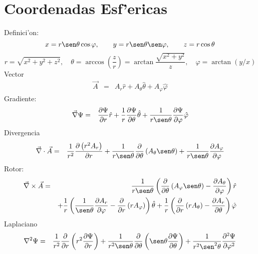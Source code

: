 \section{Coordenadas Esf'ericas}
Definici'on:
\begin{equation}
    x  =  r\sen\theta\cos\varphi, \qquad
    y  =  r\sen\theta\sen\varphi , \qquad
    z  =  r\cos\theta
\end{equation}
\begin{equation}
    r  =  \sqrt{x^2 + y^2 + z^2} , \quad
    \theta  =  \arccos(\frac{z}{r}) = \arctan{\frac{\sqrt{x^2+y^2}}{z}}, \quad
    \varphi  =  \arctan{(y/x)}
\end{equation}
Vector
\begin{eqnarray}
\vec{A}
&=& A_r {\hat r} + A_\theta {\hat \theta} +
A_\varphi {\hat \varphi}
\end{eqnarray}
Gradiente:
\begin{eqnarray}
 \vec\nabla\Psi
 &=& {\partial\Psi\over \partial r} {\hat r}
  + {1 \over r}{\partial\Psi\over \partial \theta} {\hat \theta}
  + {1 \over r\sen\theta}{\partial\Psi\over \partial \varphi} {\hat \varphi}
\end{eqnarray}
Divergencia
\begin{eqnarray}
 \vec\nabla \cdot \vec{A}
&=& {1 \over r^2}{\partial \left( r^2 A_r \right) \over \partial r}
  + {1 \over r\sen\theta}{\partial \over \partial \theta} \left(
A_\theta\sen\theta \right)
  + {1 \over r\sen\theta}{\partial A_\varphi \over \partial \varphi}
\end{eqnarray}
Rotor:
\begin{eqnarray}
\vec\nabla \times  \vec{A}
&=&  {1 \over r\sen\theta}\left({\partial \over \partial \theta}
\left( A_\varphi\sen\theta \right)    - {\partial A_\theta \over \partial
\varphi}\right) {\hat r} \nonumber\\
&&+    {1 \over r}\left({1 \over \sen\theta}{\partial A_r \over \partial
\varphi} - {\partial \over \partial r} \left( r A_\varphi \right) \right)
 {\hat \theta}  +   {1 \over r}\left({\partial \over \partial r} \left( r
A_\theta
\right)  - {\partial A_r \over \partial \theta}\right)  {\hat \varphi}
\end{eqnarray}
Laplaciano
\begin{eqnarray}
 \nabla^2 \Psi
&=&  {1 \over r^2}{\partial \over \partial r}\left(r^2 {\partial\Psi\over
\partial r}\right)   + {1 \over r^2\sen\theta}{\partial \over \partial
\theta}\left(\sen\theta {\partial\Psi\over \partial \theta}\right)
  + {1 \over r^2\sen^2\theta}{\partial^2\Psi\over \partial \varphi^2}
\end{eqnarray}
